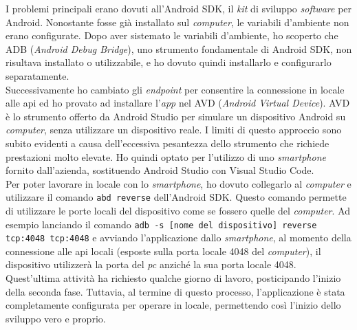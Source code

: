 I problemi principali erano dovuti all'Android SDK, il \textit{kit} di sviluppo \textit{software} per Android. Nonostante fosse 
già installato sul \textit{computer}, le variabili d'ambiente non erano configurate. Dopo aver sistemato le variabili 
d'ambiente, ho scoperto che ADB (\textit{Android Debug Bridge}), uno strumento fondamentale di Android SDK, non risultava 
installato o utilizzabile, e ho dovuto quindi installarlo e configurarlo separatamente.\\
Successivamente ho cambiato gli \textit{endpoint} per consentire la connessione in locale alle \gls{api} ed ho provato ad installare 
l'\textit{app} nel AVD (\textit{Android Virtual Device}). AVD è lo strumento offerto da Android Studio per simulare un dispositivo 
Android su \textit{computer}, senza utilizzare un dispositivo reale. I limiti di questo approccio sono subito evidenti a 
causa dell'eccessiva pesantezza dello strumento che richiede prestazioni molto elevate. 
Ho quindi optato per l'utilizzo di uno \textit{smartphone} fornito dall'azienda, sostituendo Android Studio con Visual Studio Code.\\
Per poter lavorare in locale con lo \textit{smartphone}, ho dovuto collegarlo al \textit{computer} e utilizzare il comando 
\texttt{abd reverse} dell'Android SDK. Questo comando permette di utilizzare le porte locali del dispositivo come se fossero quelle 
del \textit{computer}. Ad esempio lanciando il comando \texttt{adb -s [nome del dispositivo] reverse tcp:4048 tcp:4048} e 
avviando l'applicazione dallo \textit{smartphone}, al momento della connessione alle \gls{api} locali (esposte sulla porta 
locale 4048 del \textit{computer}), il dispositivo utilizzerà la porta del \textit{pc} anziché la sua porta 
locale 4048.\\
Quest'ultima attività ha richiesto qualche giorno di lavoro, posticipando l'inizio della seconda fase.
Tuttavia, al termine di questo processo, l'applicazione è stata completamente configurata per operare in locale, 
permettendo così l'inizio dello sviluppo vero e proprio.


